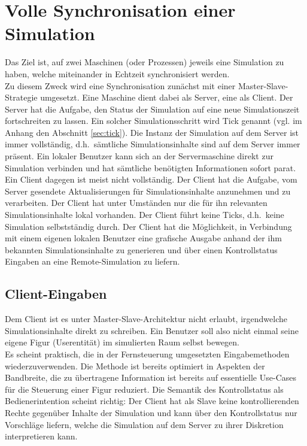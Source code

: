 \section{Volle Synchronisation einer Simulation}
Das Ziel ist, auf zwei Maschinen (oder Prozessen) jeweils eine Simulation zu haben, welche miteinander in Echtzeit synchronisiert werden.\\
Zu diesem Zweck wird eine Synchronisation zunächst mit einer Master-Slave-Strategie umgesetzt. Eine Maschine dient dabei als Server, eine als Client.
Der Server hat die Aufgabe, den Status der Simulation auf eine neue Simulationszeit fortschreiten zu lassen. Ein solcher Simulationsschritt wird Tick genannt (vgl. im Anhang den Abschnitt \ref{sec:tick}). Die Instanz der Simulation auf dem Server ist immer vollständig, d.h.~sämtliche Simulationsinhalte sind auf dem Server immer präsent. Ein lokaler Benutzer kann sich an der Servermaschine direkt zur Simulation verbinden und hat sämtliche benötigten Informationen sofort parat.\\
Ein Client dagegen ist meist nicht vollständig. Der Client hat die Aufgabe, vom Server gesendete Aktualisierungen für Simulationsinhalte anzunehmen und zu verarbeiten. Der Client hat unter Umständen nur die für ihn relevanten Simulationsinhalte lokal vorhanden. Der Client führt keine Ticks, d.h.~keine Simulation selbstständig durch. Der Client hat die Möglichkeit, in Verbindung mit einem eigenen lokalen Benutzer eine grafische Ausgabe anhand der ihm bekannten Simulationsinhalte zu generieren und über einen Kontrollstatus Eingaben an eine Remote-Simulation zu liefern. 

\subsection{Client-Eingaben}
Dem Client ist es unter Master-Slave-Architektur nicht erlaubt, irgendwelche Simulationsinhalte direkt zu schreiben. Ein Benutzer soll also nicht einmal seine eigene Figur (Userentität) im simulierten Raum selbst bewegen.\\
Es scheint praktisch, die in der Fernsteuerung umgesetzten Eingabemethoden wiederzuverwenden. Die Methode ist bereits optimiert in Aspekten der Bandbreite, die zu übertragene Information ist bereits auf essentielle Use-Cases für die Steuerung einer Figur reduziert. Die Semantik des Kontrollstatus als Bedienerintention scheint richtig: Der Client hat als Slave keine kontrollierenden Rechte gegenüber Inhalte der Simulation und kann über den Kontrollstatus nur Vorschläge liefern, welche die Simulation auf dem Server zu ihrer Diskretion interpretieren kann.

